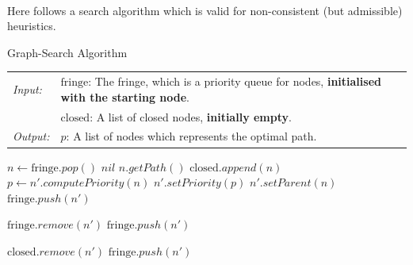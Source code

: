 \documentclass[9pt,a4paper]{extarticle}
\newenvironment{solution}
    {%
    \color{red}
    }
    { 
    \color{black}
    }
\begin{document}
    \begin{solution}
    \\
    Here follows a search algorithm which is valid for non-consistent (but admissible) heuristics.
\begin{algorithm}[H]
\caption{Graph-Search Algorithm}\label{algo:GS}
\begin{tabular}{ll}
    \textit{Input:}  & $\text{fringe}$: The fringe, which is a priority queue for nodes, \textbf{initialised with the starting node}. \\
     & $\text{closed}$: A list of closed nodes, \textbf{initially empty}.\\
     \textit{Output:}  & $p$: A list of nodes which represents the optimal path.\\
\end{tabular}
\small
\begin{algorithmic}[1]
\State $n \gets \text{fringe}.pop()$ %
 \State \Return $nil$
\EndIf
{}
   \State \Return $n.getPath()$
\EndIf
\State $\text{closed}.append(n)$
    \State $p \gets n'.computePriority(n)$
    \State $n'.setPriority(p)$
    \State $n'.setParent(n)$
    \State $\text{fringe}.push(n')$
    
    \State $\text{fringe}.remove(n')$
    \State $\text{fringe}.push(n')$
    
    \State $\text{closed}.remove(n')$
    \State $\text{fringe}.push(n')$
    \EndIf
\EndFor
\EndWhile
\EndProcedure
\end{algorithmic}
\vspace{1em}
\end{algorithm}
    \end{solution}
\end{document}
